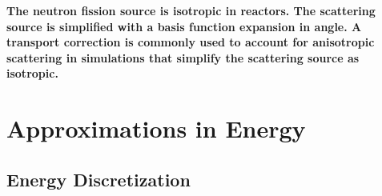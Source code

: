 




\begin{emphbox}
\textbf{The neutron fission source is isotropic in reactors. The scattering source is simplified with a basis function expansion in angle. A transport correction is commonly used to account for anisotropic scattering in simulations that simplify the scattering source as isotropic.}
\end{emphbox}


\section{Approximations in Energy}
\label{sec:chap2-approx-energy}

\subsection{Energy Discretization}
\label{subsec:chap2-energy}

